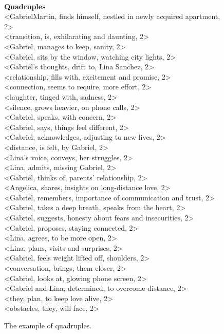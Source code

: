 \begin{figure}[h!]
{\begin{tcolorbox}
\\
\textbf{Quadruples}\\
<GabrielMartin, finds himself, nestled in newly acquired apartment, 2>\\
<transition, is, exhilarating and daunting, 2>\\
<Gabriel, manages to keep, sanity, 2>\\
<Gabriel, sits by the window, watching city lights, 2>\\
<Gabriel's thoughts, drift to, Lina Sanchez, 2>\\
<relationship, fills with, excitement and promise, 2>\\
<connection, seems to require, more effort, 2>\\
<laughter, tinged with, sadness, 2>\\
<silence, grows heavier, on phone calls, 2>\\
<Gabriel, speaks, with concern, 2>\\
<Gabriel, says, things feel different, 2>\\
<Gabriel, acknowledges, adjusting to new lives, 2>\\
<distance, is felt, by Gabriel, 2>\\
<Lina's voice, conveys, her struggles, 2>\\
<Lina, admits, missing Gabriel, 2>\\
<Gabriel, thinks of, parents' relationship, 2>\\
<Angelica, shares, insights on long-distance love, 2>\\
<Gabriel, remembers, importance of communication and trust, 2>\\
<Gabriel, takes a deep breath, speaks from the heart, 2>\\
<Gabriel, suggests, honesty about fears and insecurities, 2>\\
<Gabriel, proposes, staying connected, 2>\\
<Lina, agrees, to be more open, 2>\\
<Lina, plans, visits and surprises, 2>\\
<Gabriel, feels weight lifted off, shoulders, 2>\\
<conversation, brings, them closer, 2>\\
<Gabriel, looks at, glowing phone screen, 2>\\
<Gabriel and Lina, determined, to overcome distance, 2>\\
<they, plan, to keep love alive, 2>\\
<obstacles, they, will face, 2>\\
\end{tcolorbox}}
\caption{The example of quadruples.}
\label{fig:4ple_example}
\end{figure}





